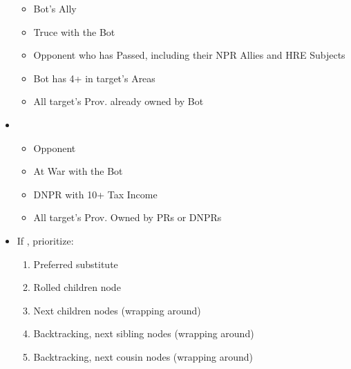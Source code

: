 \documentclass[10pt]{article}
\begin{document}
\begin{itemize}
\begin{itemize}
		\item Bot's Ally
		\item Truce with the Bot
		\item Opponent who has Passed, including their NPR Allies and HRE Subjects 
		\item Bot has 4+ \influence in target's Areas
		\item All target's Prov. already owned by Bot
	\end{itemize}
	\item {}
	\begin{itemize}
		\item Opponent
		\item At War with the Bot
		\item DNPR with 10+ Tax Income
		\item All target's Prov. Owned by PRs or DNPRs
	\end{itemize}
	\item If , prioritize:
	\begin{enumerate}
		\item Preferred substitute
		\item Rolled children node
		\item Next children nodes (wrapping around)
		\item Backtracking, next sibling nodes (wrapping around)
		\item Backtracking, next cousin nodes (wrapping around)
	\end{enumerate}
\end{itemize}
\end{document}
